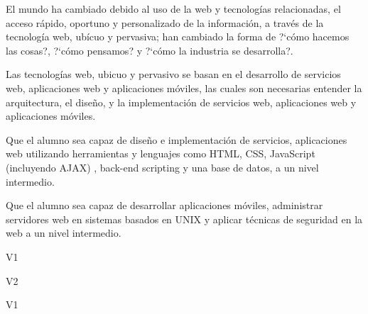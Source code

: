 \begin{syllabus}


\begin{justification}
El mundo ha cambiado debido al uso de la web y tecnologías relacionadas, el acceso rápido, oportuno y personalizado de la
información, a través de la tecnología web, ubícuo  y pervasiva; han cambiado la forma de ?`cómo hacemos las cosas?, ?`cómo pensamos? y ?`cómo la industria se desarrolla?.

Las tecnologías web, ubicuo  y pervasivo se basan en el desarrollo de servicios web, aplicaciones web y aplicaciones móviles,
las cuales son necesarias entender la arquitectura, el diseño, y la implementación de servicios web, aplicaciones web y aplicaciones móviles.
\end{justification}

\begin{goals}
    \item Que el alumno sea capaz de diseño e implementación de servicios, aplicaciones web utilizando herramientas y lenguajes como HTML, CSS,
    JavaScript (incluyendo AJAX) , back-end scripting y una base de datos, a un nivel intermedio.
    \item Que el alumno sea capaz de desarrollar aplicaciones móviles, administrar servidores web en sistemas basados en UNIX y aplicar técnicas de seguridad en la web a un nivel intermedio.
\end{goals}

\begin{outcomes}{V1}
    \item {}
    \item {}
    \item {}
    \item {}
\end{outcomes}

\begin{outcomes}{V2}
    \item {}
    \item {}
    \item {}
    \item {}
\end{outcomes}

\begin{competences}{V1}
    \item {}
    \item {}
    \item {}
\end{competences}


\end{syllabus}
